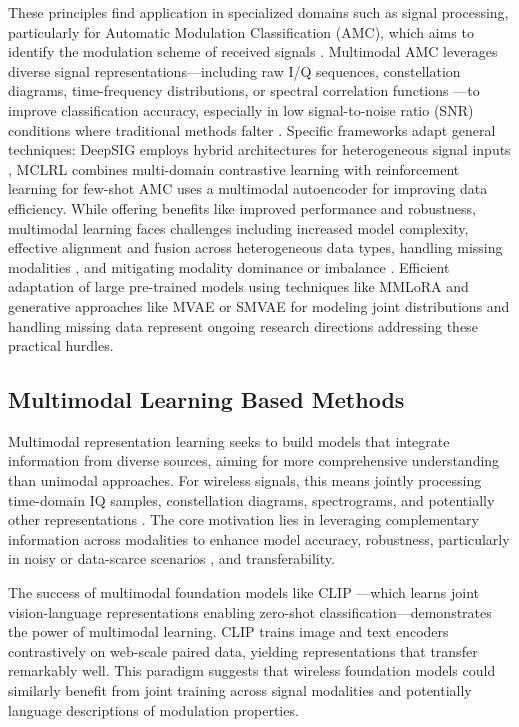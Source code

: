 These principles find application in specialized domains such as signal processing, particularly for Automatic Modulation Classification (AMC), which aims to identify the modulation scheme of received signals \cite{qiu2023deepsig}. Multimodal AMC leverages diverse signal representations—including raw I/Q sequences, constellation diagrams, time-frequency distributions, or spectral correlation functions \cite{xu2025mclrl}—to improve classification accuracy, especially in low signal-to-noise ratio (SNR) conditions where traditional methods falter \cite{li2022amcmlp}. Specific frameworks adapt general techniques: DeepSIG employs hybrid architectures for heterogeneous signal inputs \cite{qiu2023deepsig}, MCLRL combines multi-domain contrastive learning with reinforcement learning for few-shot AMC \cite{xu2025mclrl} uses a multimodal autoencoder for improving data efficiency. While offering benefits like improved performance and robustness, multimodal learning faces challenges including increased model complexity, effective alignment and fusion across heterogeneous data types, handling missing modalities \cite{wu2024deep}, and mitigating modality dominance or imbalance \cite{haouhat2023modality}. Efficient adaptation of large pre-trained models using techniques like MMLoRA \cite{wang2023improving, sun2024improving} and generative approaches like MVAE \cite{wu2018multimodal} or SMVAE \cite{zhou2022generalizing, zhou2022span} for modeling joint distributions and handling missing data represent ongoing research directions addressing these practical hurdles.

\subsection{Multimodal Learning Based Methods}\label{sec:multi}

Multimodal representation learning seeks to build models that integrate information from diverse sources, aiming for more comprehensive understanding than unimodal approaches. For wireless signals, this means jointly processing time-domain IQ samples, constellation diagrams, spectrograms, and potentially other representations \cite{yuan2025survey}. The core motivation lies in leveraging complementary information across modalities to enhance model accuracy, robustness, particularly in noisy or data-scarce scenarios \cite{akkus2023multimodal}, and transferability.

The success of multimodal foundation models like CLIP \cite{radford2021learning}—which learns joint vision-language representations enabling zero-shot classification—demonstrates the power of multimodal learning. CLIP trains image and text encoders contrastively on web-scale paired data, yielding representations that transfer remarkably well. This paradigm suggests that wireless foundation models could similarly benefit from joint training across signal modalities and potentially language descriptions of modulation properties.

